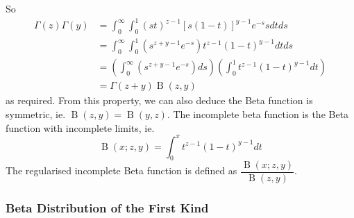 \documentclass[11pt]{report} %
\begin{document}
So
\begin{align}
\Gamma\left(z\right)\Gamma\left(y\right) &= \int_{0}^{\infty}\int_{0}^{1}\left(st\right)^{z - 1}\left[s\left(1 - t\right)\right]^{y - 1}e^{-s}sdtds \\
&= \int_{0}^{\infty}\int_{0}^{1}\left(s^{z + y - 1}e^{-s}\right)t^{z - 1}\left(1 - t\right)^{y - 1}dtds \\
&= \left(\int_{0}^{\infty}\left(s^{z + y - 1}e^{-s}\right)ds\right)\left(\int_{0}^{1}t^{z - 1}\left(1 - t\right)^{y - 1}dt\right) \\
&= \Gamma\left(z + y\right)\operatorname{B}\left(z, y\right)
\end{align}
as required. From this property, we can also deduce the Beta function is symmetric, ie. $\operatorname{B}\left(z, y\right) = \operatorname{B}\left(y, z\right)$. The incomplete beta function is the Beta function with incomplete  limits, ie.
\begin{equation}
\operatorname{B}\left(x; z, y\right) = \int_{0}^{x}t^{z - 1}\left(1 - t\right)^{y - 1}dt
\end{equation}
The regularised incomplete Beta function is defined as $\dfrac{\operatorname{B}\left(x; z, y\right)}{\operatorname{B}\left(z, y\right)}$.

\subsubsection{Beta Distribution of the First Kind}
\end{document}
